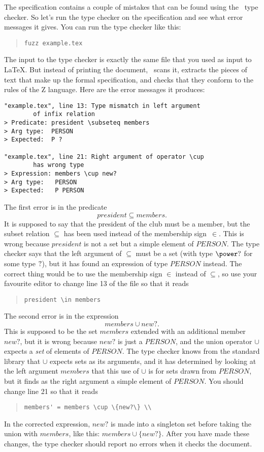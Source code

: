 The specification contains a couple of mistakes that can be
found using the \fuzz\ type checker.  So let's run the type checker
on the specification and see what error messages it gives.  You
can run the type checker like this:
\begin{quote}
        \verb/fuzz example.tex/
\end{quote}
The input to the type checker is exactly the same file that you used
as input to \LaTeX.  But instead of printing the document, \fuzz\
scans it, extracts the pieces of text that make up the
formal specification, and checks that they conform to the rules of
the Z language.  Here are the error messages it produces:
\begin{verbatim}
"example.tex", line 13: Type mismatch in left argument
        of infix relation
> Predicate: president \subseteq members
> Arg type:  PERSON
> Expected:  P ?

"example.tex", line 21: Right argument of operator \cup 
        has wrong type
> Expression: members \cup new?
> Arg type:   PERSON
> Expected:   P PERSON
\end{verbatim}
The first error is in the predicate
\[ president \subseteq members. \]
It is supposed to say that the president of the club must be a
member, but the subset relation $\subseteq$ has been used instead of
the membership sign~$\in$.  This is wrong because $president$ is not
a set but a simple element of $PERSON$.  The type checker says that
the left argument of $\subseteq$ must be a set (with type $\power
\hbox{?}$ for some type $\hbox{?}$), but it has found an expression
of type $PERSON$ instead.
The correct thing would be to use the membership sign $\in$ instead
of $\subseteq$, so use your favourite editor to change line 13 of
the file so that it reads
\begin{quote}
        \verb/president \in members/
\end{quote}
The second error is in the expression
\[ members \cup new?. \]
This is supposed to be the set $members$
extended with an additional member $new?$, but it is wrong because
$new?$ is just a $PERSON$, and the union operator $\cup$ expects a
{\em set\/} of elements of $PERSON$.  The type checker knows from
the standard library that $\cup$ expects sets as its arguments, and
it has determined by looking at the left argument $members$ that
this use of $\cup$ is for sets drawn from $PERSON$, but it finds as
the right argument a simple element of $PERSON$.  You should change
line 21 so that it reads
\begin{quote}
        \verb/members' = members \cup \{new?\} \\/
\end{quote}
In the corrected expression, $new?$ is made into a singleton set
before taking the union with $members$, like this:
$members \cup \{new?\}$.
After you have made these changes, the type checker should report no
errors when it checks the document.

